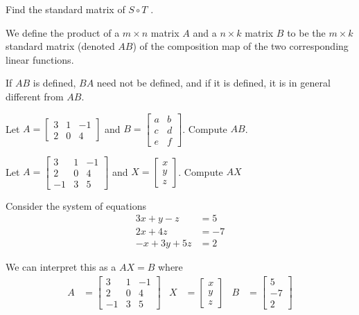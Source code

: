 \begin{applicationActivities}{1}{21}
\begin{activity}{5}
  Find the standard matrix of $S \circ T$ .
\end{activity}

\begin{definition}
We define the product of a $m \times n$ matrix $A$ and a $n \times k$ matrix $B$ to be the $m \times k$ standard matrix (denoted $AB$) of the composition map of the two corresponding linear functions.
\end{definition}

\begin{fact}
If $AB$ is defined, $BA$ need not be defined, and if it is defined, it is in general different from $AB$.
\end{fact}

\begin{activity}{10}
Let $A=\begin{bmatrix} 3 & 1 & -1 \\ 2 & 0 & 4  \end{bmatrix}$ and $B=\begin{bmatrix} a & b \\ c & d\\ e & f \end{bmatrix}$.  Compute $AB$.
\end{activity}


\begin{activity}{5}
Let $A=\begin{bmatrix} 3 & 1 & -1 \\ 2 & 0 & 4 \\ -1 & 3 & 5 \end{bmatrix}$ and $X=\begin{bmatrix} x \\ y \\ z \end{bmatrix}$.
Compute $AX$
\end{activity}

\begin{observation}
Consider the  system of equations
\begin{align*}
3x+y-z &= 5 \\ 2x+4z &= -7 \\ -x+3y+5z &=2
\end{align*}

We can interpret this as a  $AX=B$ where
\begin{align*}
A&=\begin{bmatrix} 3 & 1 & -1 \\ 2 & 0 & 4 \\ -1 & 3 & 5  \end{bmatrix} & X&=\begin{bmatrix} x  \\ y \\ z  \end{bmatrix} & B &= \begin{bmatrix} 5 \\ -7 \\ 2 \end{bmatrix}
\end{align*}


\end{observation}
\end{applicationActivities}
